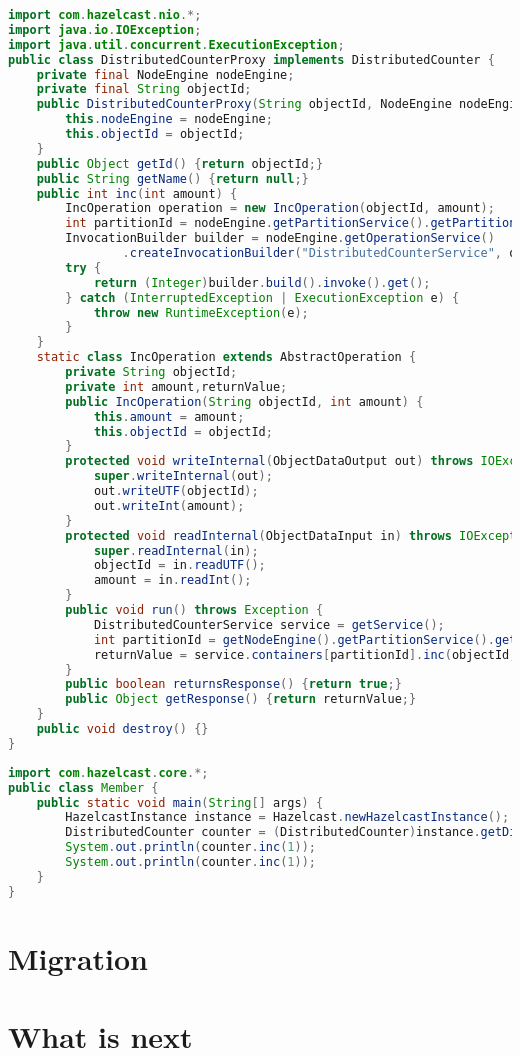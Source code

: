 \begin{lstlisting}[language=java]
import com.hazelcast.nio.*;
import java.io.IOException;
import java.util.concurrent.ExecutionException;
public class DistributedCounterProxy implements DistributedCounter {
    private final NodeEngine nodeEngine;
    private final String objectId;
    public DistributedCounterProxy(String objectId, NodeEngine nodeEngine) {
        this.nodeEngine = nodeEngine;
        this.objectId = objectId;
    }
    public Object getId() {return objectId;}
    public String getName() {return null;}
    public int inc(int amount) {
        IncOperation operation = new IncOperation(objectId, amount);
        int partitionId = nodeEngine.getPartitionService().getPartitionId(objectId);
        InvocationBuilder builder = nodeEngine.getOperationService()
                .createInvocationBuilder("DistributedCounterService", operation, partitionId);
        try {
            return (Integer)builder.build().invoke().get();
        } catch (InterruptedException | ExecutionException e) {
            throw new RuntimeException(e);
        }
    }
    static class IncOperation extends AbstractOperation {
        private String objectId;
        private int amount,returnValue;
        public IncOperation(String objectId, int amount) {
            this.amount = amount;
            this.objectId = objectId;
        }
        protected void writeInternal(ObjectDataOutput out) throws IOException {
            super.writeInternal(out);
            out.writeUTF(objectId);
            out.writeInt(amount);
        }
        protected void readInternal(ObjectDataInput in) throws IOException {
            super.readInternal(in);
            objectId = in.readUTF();
            amount = in.readInt();
        }
        public void run() throws Exception {
            DistributedCounterService service = getService();
            int partitionId = getNodeEngine().getPartitionService().getPartitionId(objectId);
            returnValue = service.containers[partitionId].inc(objectId, amount);
        }
        public boolean returnsResponse() {return true;}
        public Object getResponse() {return returnValue;}
    }
    public void destroy() {}
}
\end{lstlisting}

\begin{lstlisting}[language=java]
import com.hazelcast.core.*;
public class Member {
    public static void main(String[] args) {
        HazelcastInstance instance = Hazelcast.newHazelcastInstance();
        DistributedCounter counter = (DistributedCounter)instance.getDistributedObject("DistributedCounterService","counter1");
        System.out.println(counter.inc(1));
        System.out.println(counter.inc(1));
    }
}
\end{lstlisting}

\section{Migration}

\section{What is next}